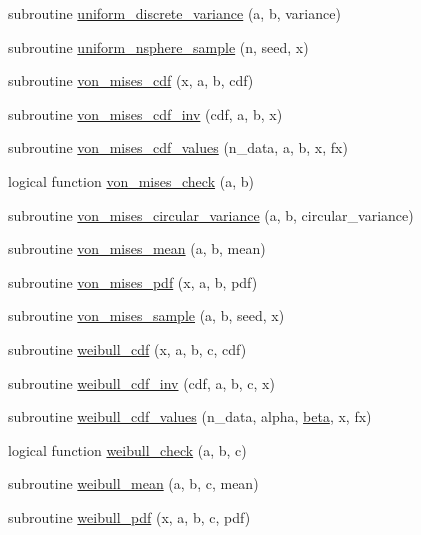 \begin{DoxyCompactItemize}
subroutine \hyperlink{subroutines_8f_a874a7fc75f53b8a682b9c8978939fda5}{uniform\+\_\+discrete\+\_\+variance} (a, b, variance)
\item 
subroutine \hyperlink{subroutines_8f_a567091bcdecad2248c96535c412d6195}{uniform\+\_\+nsphere\+\_\+sample} (n, seed, x)
\item 
subroutine \hyperlink{subroutines_8f_a5c4785e88e38b424c52cce4689445dfc}{von\+\_\+mises\+\_\+cdf} (x, a, b, cdf)
\item 
subroutine \hyperlink{subroutines_8f_a0d6b2b89e87cdefab6293dcb412af08f}{von\+\_\+mises\+\_\+cdf\+\_\+inv} (cdf, a, b, x)
\item 
subroutine \hyperlink{subroutines_8f_a4c65f800f570436a4cb12dddb3c8b7a3}{von\+\_\+mises\+\_\+cdf\+\_\+values} (n\+\_\+data, a, b, x, fx)
\item 
logical function \hyperlink{subroutines_8f_a40a097c025b70be0e09b0de70e1da45b}{von\+\_\+mises\+\_\+check} (a, b)
\item 
subroutine \hyperlink{subroutines_8f_a662131cbe821a341319c8a9ca67f95af}{von\+\_\+mises\+\_\+circular\+\_\+variance} (a, b, circular\+\_\+variance)
\item 
subroutine \hyperlink{subroutines_8f_a97b8b21e59cd05efc755304eb6fd543f}{von\+\_\+mises\+\_\+mean} (a, b, mean)
\item 
subroutine \hyperlink{subroutines_8f_a385af85b16bbe1659e0de9e6e916d3d3}{von\+\_\+mises\+\_\+pdf} (x, a, b, pdf)
\item 
subroutine \hyperlink{subroutines_8f_a06bd71cbe32f074e5bb5ca85524936be}{von\+\_\+mises\+\_\+sample} (a, b, seed, x)
\item 
subroutine \hyperlink{subroutines_8f_ae3e1a96ae8ad17ffd698fba05207d5f8}{weibull\+\_\+cdf} (x, a, b, c, cdf)
\item 
subroutine \hyperlink{subroutines_8f_a017a7f1ff8e2de34d608525f4fa057da}{weibull\+\_\+cdf\+\_\+inv} (cdf, a, b, c, x)
\item 
subroutine \hyperlink{subroutines_8f_aed1852e1d63e6ebf573f1ff0e117f958}{weibull\+\_\+cdf\+\_\+values} (n\+\_\+data, alpha, \hyperlink{_bhabha__fortran__sem__doxy_8f_a4545c4482f31f1e6eddae40f6ed6bbfb}{beta}, x, fx)
\item 
logical function \hyperlink{subroutines_8f_afb02fe9720b1d511216ff02e43dc6b5e}{weibull\+\_\+check} (a, b, c)
\item 
subroutine \hyperlink{subroutines_8f_a023bd1260ec4d716669eca0aa0309343}{weibull\+\_\+mean} (a, b, c, mean)
\item 
subroutine \hyperlink{subroutines_8f_a9f72d60350cbaeb6b488cd822a8b59c3}{weibull\+\_\+pdf} (x, a, b, c, pdf)

\end{DoxyCompactItemize}
